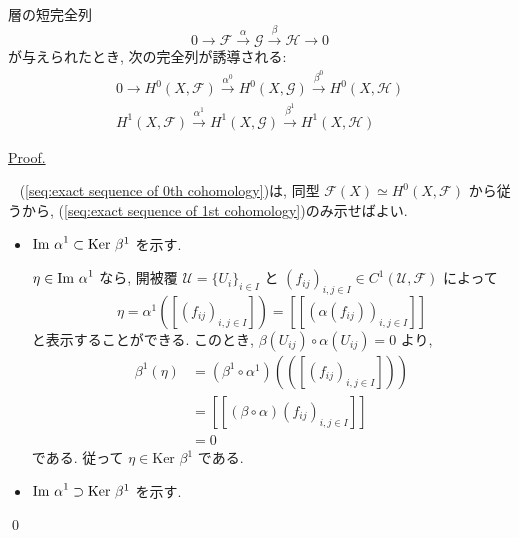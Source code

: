 \documentclass[a4paper,10pt,dvipdfmx]{jsreport}
\newenvironment{prop*}{\refstepcounter{theorem}\begin{itembox}[l]{\underline{Proposition \arabic{chapter}.\arabic{section}.\arabic{theorem}. }}\vspace{-0.5zh}\ }{\end{itembox}}
\renewenvironment{proof}{\begin{flushleft} \underline{Proof.} \end{flushleft}\vspace{-1zh}\ }{\qed\\}
\newcounter{theorem}[section]
\renewcommand{\Im}[1]{{{\rm Im\ }{#1}}}
\renewcommand{\ker}{\textrm{Ker }}
\theoremstyle{definition}
\begin{document}
\begin{prop*}
    層の短完全列
    \[
        0 \to \mathscr{F} \xrightarrow{\alpha} \mathscr{G} \xrightarrow{\beta} \mathscr{H} \to 0
    \]
    が与えられたとき, 次の完全列が誘導される:
    \begin{align}
        0 \to H^0(X,\mathscr{F}) \xrightarrow{\alpha^0} H^0(X,\mathscr{G}) \xrightarrow{\beta^0} H^0(X,\mathscr{H}) \label{seq:exact sequence of 0th cohomology}\\
        H^1(X,\mathscr{F}) \xrightarrow{\alpha^1} H^1(X,\mathscr{G}) \xrightarrow{\beta^1} H^1(X,\mathscr{H}) \label{seq:exact sequence of 1st cohomology}
    \end{align}
\end{prop*}
\begin{proof}
    (\ref{seq:exact sequence of 0th cohomology})は, 同型 \(\mathscr{F}(X) \simeq H^0(X,\mathscr{F})\) から従うから, (\ref{seq:exact sequence of 1st cohomology})のみ示せばよい.
    \begin{itemize}
        \item \(\Im \alpha^1 \subset \ker \beta^1\) を示す.

            \(\eta \in \Im \alpha^1\) なら, 開被覆 \(\mathcal{U} = \{U_i\}_{i\in I}\) と \((f_{ij})_{i,j\in I} \in C^1(\mathcal{U},\mathscr{F})\) によって
            \[
                \eta = \alpha^1 ([(f_{ij})_{i,j\in I}]) = [[(\alpha(f_{ij}))_{i,j\in I}]]
            \] 
            と表示することができる. このとき, \(\beta(U_{ij}) \circ \alpha(U_{ij}) = 0\) より,
            \begin{align*}
                \beta^1(\eta)
                &= (\beta^1 \circ \alpha^1) (([(f_{ij})_{i,j\in I}]))\\
                &= [[(\beta \circ \alpha) (f_{ij})_{i,j \in I}]]\\
                &= 0
            \end{align*}
            である. 従って \(\eta \in \ker \beta^1\) である.
        \item \(\Im \alpha^1 \supset \ker \beta^1\) を示す.
        

\end{itemize}
\end{proof}
\end{document}

